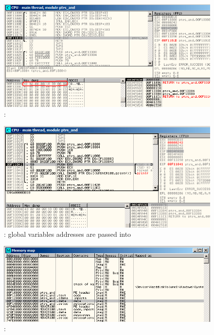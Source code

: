 \begin{figure}[H]
\centering
\includegraphics[scale=\FigScale]{patterns/061_pointers/olly_global3.png}
\caption{\olly: \ttf {}}
\label{fig:pointers_olly_global_3}
\end{figure}

\begin{figure}[H]
\centering
\includegraphics[scale=\FigScale]{patterns/061_pointers/olly_global4.png}
\caption{\olly: 
{global variables addresses are passed into} \printf}
\label{fig:pointers_olly_global_4}
\end{figure}

\begin{figure}[H]
\centering
\includegraphics[scale=\FigScale]{patterns/061_pointers/olly_global5.png}
\caption{\olly: }
\label{fig:pointers_olly_global_5}
\end{figure}

